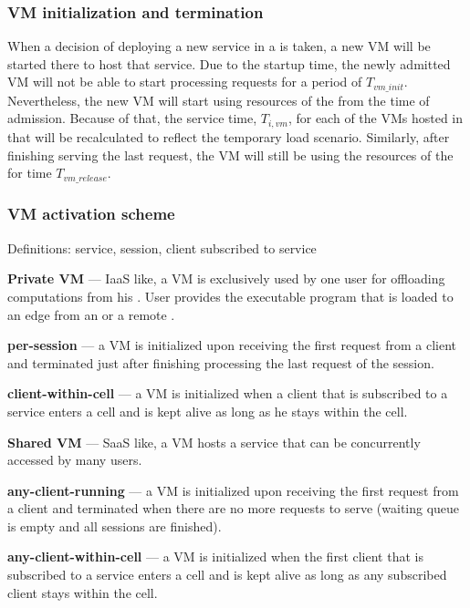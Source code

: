 \subsubsection{VM initialization and termination}
When a decision of deploying a new service in a \dc{} is taken, a new VM will be started there to host that service.
Due to the startup time, the newly admitted VM will not be able to start processing requests for a period of $T_{vm\_init}$. 
Nevertheless, the new VM will start using resources of the \dc{} from the time of admission.
Because of that, the service time, $T_{i,vm}$, for each of the VMs hosted in that \dc{} will be recalculated to reflect the temporary load scenario.
Similarly, after finishing serving the last request, the VM will still be using the resources of the \dc{} for time $T_{vm\_release}$.

\subsubsection{VM activation scheme}
Definitions: service, session, client subscribed to service 

\textbf{Private VM} --- IaaS like, a VM is exclusively used by one user for offloading computations from his \ue{}.
User provides the executable program that is loaded to an edge \dc{} from an \ue{} or a remote \dc{}.
		\begin{description}
			\item \textbf{per-session} --- a VM is initialized upon receiving the first request from a client and terminated just after finishing processing the last request of the session.
			\item \textbf{client-within-cell} --- a VM is initialized when a client that is subscribed to a service enters a cell and is kept alive as long as he stays within the cell. 
		\end{description}
			
\textbf{Shared VM} --- SaaS like, a VM hosts a service that can be concurrently accessed by many users.
		\begin{description}
			\item \textbf{any-client-running} --- a VM is initialized upon receiving the first request from a client and terminated when there are no more requests to serve (waiting queue is empty and all sessions are finished).
			\item \textbf{any-client-within-cell} --- a VM is initialized when the first client that is subscribed to a service enters a cell and is kept alive as long as any subscribed client stays within the cell. 
		\end{description}

